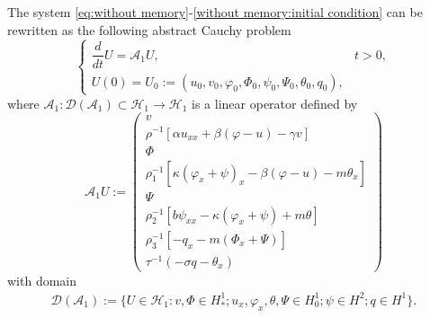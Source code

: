 \documentclass[11pt,reqno]{article}
\begin{document}
The system \eqref{eq:without memory}-\eqref{without memory:initial condition} can be rewritten as the following abstract Cauchy problem
\begin{equation}\label{model-abstract-1}
	\begin{cases}
		\dfrac{d}{dt}U = \mathcal{A}_1U, & t > 0, \\
		U(0) =  U_0 :=(u_0, v_0, \varphi_0, \Phi_0, \psi_0, \Psi_0, \theta_0, q_0),
	\end{cases}
\end{equation}
where \(\mathcal{A}_1: \mathcal{D}(\mathcal{A}_1) \subset \mathcal{H}_1 \to \mathcal{H}_1\) is a linear operator defined by \begin{equation}\label{definition:A-1}
	\mathcal{A}_1 U := \begin{pmatrix}
		v \\
		\rho^{-1} \left[ \alpha u_{xx} + \beta (\varphi - u) - \gamma v \right] \\
		\Phi \\
		\rho_1^{-1} \left[ \kappa (\varphi_x + \psi)_x - \beta (\varphi - u) - m \theta_x \right] \\
		\Psi \\
		\rho_2^{-1} \left[ b \psi_{xx} - \kappa (\varphi_x + \psi) + m\theta \right] \\
		\rho_3^{-1} \left[ -q_x - m (\Phi_x + \Psi) \right] \\
		\tau^{-1}(-\sigma q - \theta_x)
	\end{pmatrix}
\end{equation}
with domain
\begin{align*}
	\mathcal{D}(\mathcal{A}_1) := \bigg\{ U \in \mathcal{H}_1 :
	v, \Phi \in H_*^1;  u_x, \varphi_x, \theta, \Psi \in H_0^1;
	\psi \in H^2; q \in H^1
	\bigg\}.
\end{align*}
\end{document}
